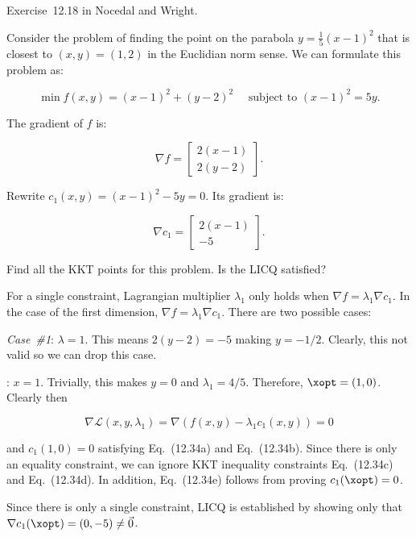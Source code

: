 \begin{problem}\label{prob:05}%
  Exercise~12.18 in Nocedal and Wright.
  
  Consider the problem of finding the point on the parabola $y=\frac{1}{5}(x-1)^{2}$ that is closest to $(x,y)=(1,2)$ in the Euclidian norm sense.  We can formulate this problem as:
  
  \[\min f(x,y)=(x-1)^2  + (y-2)^2 ~~~~~~ \text{subject to } (x-1)^2 = 5y \text{.} \]
\end{problem}

The gradient of $f$ is:

\[\nabla f =  \begin{bmatrix}
                2(x-1)\\
                2(y-2)
              \end{bmatrix} \text{.}\]

\noindent
Rewrite $c_1(x,y)=(x-1)^2-5y=0$.  Its gradient is:

\[\nabla c_1 =  \begin{bmatrix}
                  2(x-1)\\
                  -5
                \end{bmatrix} \text{.}\]

\begin{subproblem}
  Find all the KKT points for this problem.  Is the LICQ satisfied?
\end{subproblem}

For a single constraint, Lagrangian multiplier $\lambda_1$ only holds when $\nabla f = \lambda_1 \nabla c_1$.  In the case of the first dimension, $\nabla f = \lambda_1 \nabla c_1$.  There are two possible cases:

\noindent
\textit{Case~\#1}: $\lambda=1$.  This means $2(y-2)=-5$ making $y=-1/2$.  Clearly, this not valid so we can drop this case.

\noindent
{}: $x=1$.  Trivially, this makes $y=0$ and $\lambda_1=4/5$.  Therefore, $\xopt=(1,0)$.  Clearly then 

\[\nabla \mathcal{L}(x,y,\lambda_1)=\nabla (f(x,y)-\lambda_1 c_1(x,y)) = 0 \] 

\noindent
and $c_1(1,0)=0$ satisfying Eq.~(12.34a) and Eq.~(12.34b).  Since there is only an equality constraint, we can ignore KKT inequality constraints Eq.~(12.34c) and Eq.~(12.34d).  In addition, Eq.~(12.34e) follows from proving $c_1(\xopt)=0$.

Since there is only a single constraint, LICQ is established by showing only that $\nabla c_{1}(\xopt) = (0, -5) \ne \vec{0}$.  

